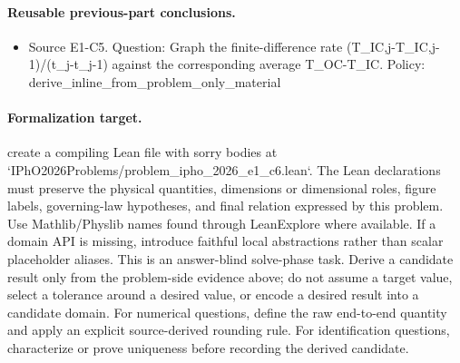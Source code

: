 \paragraph{Reusable previous-part conclusions.}
\begin{itemize}
\item Source E1-C5. Question: Graph the finite-difference rate (T\_IC,j-T\_IC,j-1)/(t\_j-t\_j-1) against the corresponding average T\_OC-T\_IC. Policy: derive\_inline\_from\_problem\_only\_material
\end{itemize}

\paragraph{Formalization target.}
create a compiling Lean file with sorry bodies at `IPhO2026Problems/problem\_ipho\_2026\_e1\_c6.lean`.
The Lean declarations must preserve the physical quantities, dimensions or dimensional roles, figure labels, governing-law hypotheses, and final relation expressed by this problem.
Use Mathlib/Physlib names found through LeanExplore where available. If a domain API is missing, introduce faithful local abstractions rather than scalar placeholder aliases.
This is an answer-blind solve-phase task. Derive a candidate result only from the problem-side evidence above; do not assume a target value, select a tolerance around a desired value, or encode a desired result into a candidate domain.
For numerical questions, define the raw end-to-end quantity and apply an explicit source-derived rounding rule. For identification questions, characterize or prove uniqueness before recording the derived candidate.

